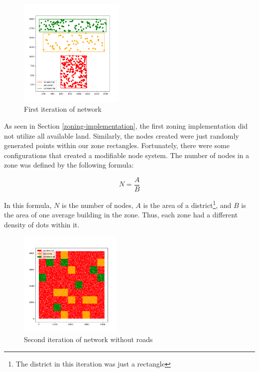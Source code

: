 \documentclass[11pt]{article}
\begin{document}
\begin{multicols}{2}
    \begin{figure}[H]
        \centering
        \vspace{-1em}
        \includegraphics[width=0.45\textwidth]{images/firstzoningwnodes.png}
        \caption{First iteration of network}
        \label{fig:first-network}
    \end{figure}

    \quad As seen in Section \ref{zoning-implementation}, the first zoning implementation did not utilize all available land. Similarly, the nodes created were just randomly generated points within our zone rectangles. Fortunately, there were some configurations that created a modifiable node system. The number of nodes in a zone was defined by the following formula:

    \[N = \frac{A}{B}\]

    In this formula, $N$ is the number of nodes, $A$ is the area of a district\footnote{The district in this iteration was just a rectangle}, and $B$ is the area of one average building in the zone. Thus, each zone had a different density of dots within it.

    \begin{figure}[H]
        \centering
        \vspace{-1em}
        \includegraphics[width=0.44\textwidth]{images/secondzoningwnodes.png}
        \caption{Second iteration of network without roads}
        \label{fig:second-nodes}
    \end{figure}


\end{multicols}
\end{document}
